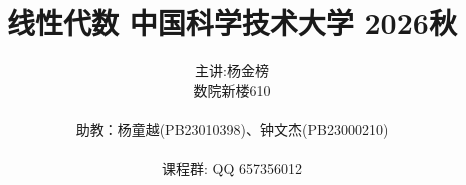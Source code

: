 \documentclass{beamer}
\begin{document}
\title{线性代数 \quad 中国科学技术大学 2026秋}
\author{主讲:杨金榜 \\ 数院新楼610 \\ \ \\ 助教：杨童越(PB23010398)、钟文杰(PB23000210) \\ \ \\ 课程群: QQ 657356012}
\date{\mydate}



\begin{frame}[plain]
\titlepage
\end{frame}




\end{document}

